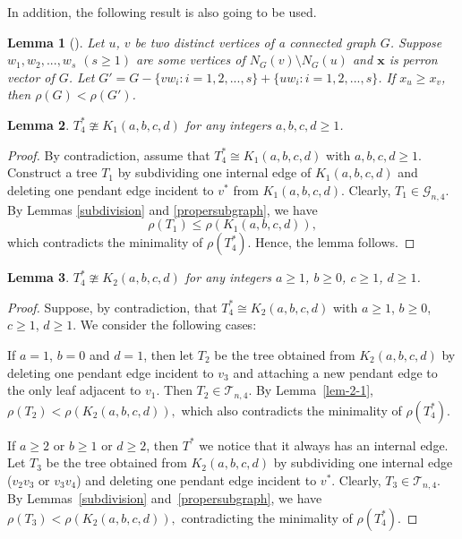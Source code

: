 \documentclass[12pt]{amsart}
\newtheorem{lem}{Lemma}[section]
\begin{document}
In addition, the following result is also going to be used. 

\begin{lem}[\cite{WuXiao2005}]\label{lem-perron-entry-radius}
	Let $u$, $v$ be two distinct vertices of a connected graph $G$. Suppose $w_1,w_2,...,w_s$ $(s\ge1)$ are some vertices of $N_G(v)\setminus N_G(u)$ and $\mathbf{x}$ is perron vector of $G$. Let
	$G'=G-\{vw_i: i=1,2,...,s\}+\{uw_i: i=1,2,...,s\}$.
	If $x_u\ge x_v$, then $\rho(G)<\rho(G')$.
\end{lem}

\begin{lem}\label{lem-3.8}
	\(T_4^*\ncong K_1(a,b,c,d)\) for any integers \(a, b, c, d \geq 1\).
\end{lem}

\begin{proof}
By contradiction, assume that \(T_4^* \cong K_1(a,b,c,d)\) with \(a, b, c, d \geq 1\). 
	Construct a tree \(T_1\) by subdividing one internal edge of  $K_1(a,b,c,d)$ and deleting one pendant edge incident to $v^*$ from \(K_1(a,b,c,d)\). 
	Clearly,  \(T_1 \in \mathcal{G}_{n,4}\). 
	By Lemmas  \ref{subdivision} and \ref{propersubgraph}, we have
	\[
	\rho(T_1) \leq \rho(K_1(a,b,c,d)),
	\]
	which contradicts the minimality of \(\rho(T_4^*)\). 
	Hence, the lemma follows.
\end{proof}



\begin{lem}\label{lem-3.9}
	\(T_4^*\ncong K_2(a,b,c,d)\) for any integers \(a \geq 1\), \(b \geq 0\), \(c \geq 1\), \(d \geq 1\).
\end{lem}

\begin{proof}
	Suppose, by contradiction, that \(T_4^* \cong K_2(a,b,c,d)\) with \(a \geq 1\), \(b \geq 0\), \(c \geq 1\), \(d \geq 1\). 
	We consider the following cases:
	
	If \(a = 1\), \(b = 0\) and \(d = 1\), then let \(T_2\) be the tree obtained from \(K_2(a,b,c,d)\) by deleting one pendant edge incident to $v_3$ and attaching a new pendant edge to the only leaf adjacent to \(v_1\). Then \(T_2 \in \mathcal{T}_{n,4}\). By Lemma~\ref{lem-2-1},
	\(
	\rho(T_2) < \rho(K_2(a,b,c,d)),
	\)
	which also contradicts the minimality of \(\rho(T_4^*)\).
	
	If \(a \geq 2\) or  \(b \geq 1\) or \(d \geq 2\), then $T^*$ we notice that it  always has an internal edge. 
	Let \(T_3\) be the tree obtained from \(K_2(a,b,c,d)\) by subdividing one internal edge ($v_2v_3$ or $v_3v_4$) and deleting one pendant edge incident to \(v^*\).
	Clearly, \(T_3 \in \mathcal{T}_{n,4}\). By Lemmas~\ref{subdivision} and~\ref{propersubgraph}, we have
	\(
	\rho(T_3) < \rho(K_2(a,b,c,d)),
	\)
	contradicting the minimality of \(\rho(T_4^*)\).
\end{proof}
\end{document}
